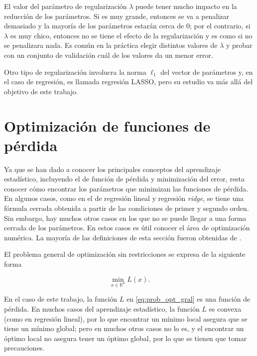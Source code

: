 El valor del parámetro de regularización $\lambda$ puede tener mucho impacto en la reducción de los parámetros. Si es muy grande, entonces se va a penalizar demasiado y la mayoría de los parámetros estarán cerca de 0; por el contrario, si $\lambda$ es muy chico, entonces no se tiene el efecto de la regularización y es como si no se penalizara nada. Es común en la práctica elegir distintos valores de $\lambda$ y probar con un conjunto de validación cuál de los valores da un menor error.

Otro tipo de regularización involucra la norma $\ell_1$ del vector de parámetros y, en el caso de regresión, es llamada regresión LASSO, pero su estudio va más allá del objetivo de este trabajo.


\section{Optimización de funciones de pérdida}

Ya que se han dado a conocer los principales conceptos del aprendizaje estadístico, incluyendo el de función de pérdida y minimización del error, resta conocer cómo encontrar los parámetros que minimizan las funciones de pérdida. En algunos casos, como en el de regresión lineal y regresión \textit{ridge}, se tiene una fórmula cerrada obtenida a partir de las condiciones de primer y segundo orden. Sin embargo, hay muchos otros casos en los que no se puede llegar a una forma cerrada de los parámetros. En estos casos es útil conocer el área de optimización numérica. La mayoría de las definiciones de esta sección fueron obtenidas de \cite{nocedal2006numerical}.

El problema general de optimización sin restricciones se expresa de la siguiente forma

\begin{equation}
  \label{eq:prob_opt_gral}
  \min_{x \in \mathbb{R}^n} L(x).
\end{equation}

En el caso de este trabajo, la función $L$ en \ref{eq:prob_opt_gral} es una función de pérdida. En muchos casos del aprendizaje estadístico, la función $L$ es convexa (como en regresión lineal), por lo que encontrar un mínimo local asegura que se tiene un mínimo global; pero en muchos otros casos no lo es, y el encontrar un óptimo local no asegura tener un óptimo global, por lo que se tienen que tomar precauciones.

